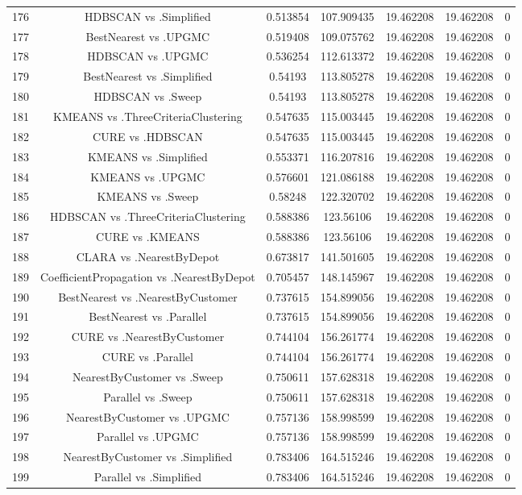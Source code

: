 \documentclass[a4paper,10pt]{article}
\begin{document}
\begin{landscape}
\begin{table}[!htp]
\begin{tabular}{ccccccc}
176&HDBSCAN vs .Simplified&0.513854&107.909435&19.462208&19.462208&0\\
177&BestNearest vs .UPGMC&0.519408&109.075762&19.462208&19.462208&0\\
178&HDBSCAN vs .UPGMC&0.536254&112.613372&19.462208&19.462208&0\\
179&BestNearest vs .Simplified&0.54193&113.805278&19.462208&19.462208&0\\
180&HDBSCAN vs .Sweep&0.54193&113.805278&19.462208&19.462208&0\\
181&KMEANS vs .ThreeCriteriaClustering&0.547635&115.003445&19.462208&19.462208&0\\
182&CURE vs .HDBSCAN&0.547635&115.003445&19.462208&19.462208&0\\
183&KMEANS vs .Simplified&0.553371&116.207816&19.462208&19.462208&0\\
184&KMEANS vs .UPGMC&0.576601&121.086188&19.462208&19.462208&0\\
185&KMEANS vs .Sweep&0.58248&122.320702&19.462208&19.462208&0\\
186&HDBSCAN vs .ThreeCriteriaClustering&0.588386&123.56106&19.462208&19.462208&0\\
187&CURE vs .KMEANS&0.588386&123.56106&19.462208&19.462208&0\\
188&CLARA vs .NearestByDepot&0.673817&141.501605&19.462208&19.462208&0\\
189&CoefficientPropagation vs .NearestByDepot&0.705457&148.145967&19.462208&19.462208&0\\
190&BestNearest vs .NearestByCustomer&0.737615&154.899056&19.462208&19.462208&0\\
191&BestNearest vs .Parallel&0.737615&154.899056&19.462208&19.462208&0\\
192&CURE vs .NearestByCustomer&0.744104&156.261774&19.462208&19.462208&0\\
193&CURE vs .Parallel&0.744104&156.261774&19.462208&19.462208&0\\
194&NearestByCustomer vs .Sweep&0.750611&157.628318&19.462208&19.462208&0\\
195&Parallel vs .Sweep&0.750611&157.628318&19.462208&19.462208&0\\
196&NearestByCustomer vs .UPGMC&0.757136&158.998599&19.462208&19.462208&0\\
197&Parallel vs .UPGMC&0.757136&158.998599&19.462208&19.462208&0\\
198&NearestByCustomer vs .Simplified&0.783406&164.515246&19.462208&19.462208&0\\
199&Parallel vs .Simplified&0.783406&164.515246&19.462208&19.462208&0\\

\end{tabular}
\end{table}
\end{landscape}
\end{document}
